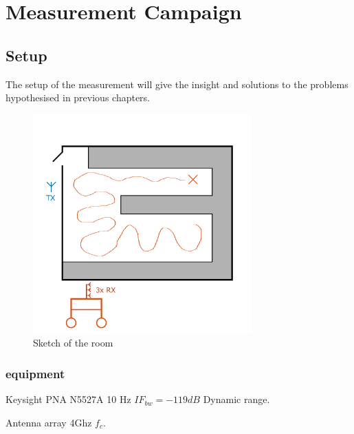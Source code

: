 \chapter{Measurement Campaign}
\section{Setup}
The setup of the measurement will give the insight and solutions to the problems hypothesised in previous chapters. 

\begin{figure}[H]
\centering
\includegraphics[width=0.75\textwidth]{figures/Gimp_figures/MeasSetup.png}
\caption{Sketch of the room}
\label{room sketch}
\end{figure}
\subsection{equipment}
\label{equip}
Keysight PNA N5527A 
10 Hz $IF_{bw} = -119dB$ Dynamic range\citep{Key_PNA}.

Antenna array 4Ghz $f_c$.


